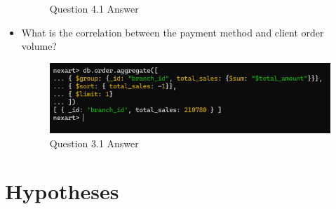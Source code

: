 \documentclass[a4Paper,12pt]{report}
\begin{document}
\begin{itemize}
\begin{figure}[H]
\caption{Question 4.1 Answer}
\end{figure}
\item What is the correlation between the payment method and client order volume?
\begin{figure}[H]
\centering
\includegraphics[scale=0.5]{images/Q3.1.png}
\caption{Question 3.1 Answer}
\end{figure}
\end{itemize}
\section{Hypotheses}
\end{document}
